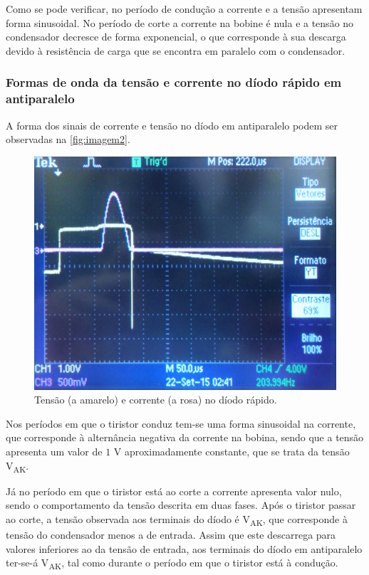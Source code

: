 \documentclass[a4paper,11pt]{article}
\numberwithin{equation}{section}
\begin{document}
Como se pode verificar, no período de condução a corrente e a tensão apresentam forma sinusoidal. No período de corte a corrente na bobine é nula e a tensão no condensador decresce de forma exponencial, o que corresponde à sua descarga devido à resistência de carga que se encontra em paralelo com o condensador.


\subsubsection{Formas de onda da tensão e corrente no díodo rápido em antiparalelo}

A forma dos sinais de corrente e tensão no díodo em antiparalelo podem ser observadas na \autoref{fig:imagem2}.

\begin{figure}[h]
	\centering
	\includegraphics[keepaspectratio=true, scale=0.15]{img/imagem2}
	\caption{Tensão (a amarelo) e corrente (a rosa) no díodo rápido.}
	\label{fig:imagem2}
	\vspace{-0.8em}
\end{figure}

Nos períodos em que o tiristor conduz tem-se uma forma sinusoidal na corrente, que corresponde à alternância negativa da corrente na bobina, sendo que a tensão apresenta um valor de $1$ V aproximadamente constante, que se trata da tensão V\textsubscript{AK}. 

Já no período em que o tiristor está ao corte a corrente apresenta valor nulo, sendo o comportamento da tensão descrita em duas fases. Após o tiristor passar ao corte, a tensão observada aos terminais do díodo é V\textsubscript{AK}, que corresponde à tensão do condensador menos a de entrada. Assim que este descarrega para valores inferiores ao da tensão de entrada, aos terminais do díodo em antiparalelo ter-se-á V\textsubscript{AK}, tal como durante o período em que o tiristor está à condução.
\end{document}
